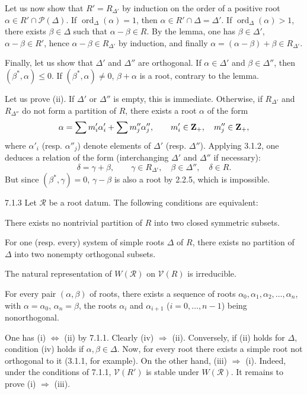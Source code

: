 Let us now show that $R'=R_{\Delta'}$ by induction on the order of a positive root $\alpha\in R'\cap\mathcal P(\Delta)$. If $\operatorname{ord}_\Delta(\alpha)=1$, then $\alpha\in R'\cap\Delta=\Delta'$. If $\operatorname{ord}_\Delta(\alpha)>1$, there exists $\beta\in\Delta$ such that $\alpha-\beta\in R$. By the lemma, one has $\beta\in\Delta'$, $\alpha-\beta\in R'$, hence $\alpha-\beta\in R_{\Delta'}$ by induction, and finally $\alpha=(\alpha-\beta)+\beta\in R_{\Delta'}$.

Finally, let us show that $\Delta'$ and $\Delta''$ are orthogonal. If $\alpha\in\Delta'$ and $\beta\in\Delta''$, then $(\beta^*,\alpha)\leq0$. If $(\beta^*,\alpha)\ne0$, $\beta+\alpha$ is a root, contrary to the lemma.

Let us prove (ii). If $\Delta'$ or $\Delta''$ is empty, this is immediate. Otherwise, if $R_{\Delta'}$ and $R_{\Delta''}$ do not form a partition of $R$, there exists a root $\alpha$ of the form
\[
\alpha=\sum m'_i\alpha'_i+\sum m''_j\alpha''_j,\qquad m'_i\in\mathbf{Z}_+,\quad m''_j\in\mathbf{Z}_+,
\]
where $\alpha'_i$ (resp. $\alpha''_j$) denote elements of $\Delta'$ (resp. $\Delta''$). Applying 3.1.2, one deduces a relation of the form (interchanging $\Delta'$ and $\Delta''$ if necessary):
\[
\delta=\gamma+\beta,\qquad\gamma\in R_{\Delta'},\quad\beta\in\Delta'',\quad\delta\in R.
\]
But since $(\beta^*,\gamma)=0$, $\gamma-\beta$ is also a root by 2.2.5, which is impossible.
\begin{proposition}{7.1.3}\label{XXI.7.1.3}
Let $\mathcal R$ be a root datum. The following conditions are equivalent:
\begin{enumeratei}
\item There exists no nontrivial partition of $R$ into two closed symmetric subsets.
\item For one (resp. every) system of simple roots $\Delta$ of $R$, there exists no partition of $\Delta$ into two nonempty orthogonal subsets.
\item The natural representation of $W(\mathcal R)$ on $\mathcal V(R)$ is irreducible.
\item For every pair $(\alpha,\beta)$ of roots, there exists a sequence of roots $\alpha_0,\alpha_1,\alpha_2,\ldots,\alpha_n$, with $\alpha=\alpha_0$, $\alpha_n=\beta$, the roots $\alpha_i$ and $\alpha_{i+1}$ ($i=0,\ldots,n-1$) being nonorthogonal.
\end{enumeratei}
\end{proposition}
One has (i) $\Leftrightarrow$ (ii) by 7.1.1. Clearly (iv) $\Rightarrow$ (ii). Conversely, if (ii) holds for $\Delta$, condition (iv) holds if $\alpha,\beta\in\Delta$. Now, for every root there exists a simple root not orthogonal to it (3.1.1, for example). On the other hand, (iii) $\Rightarrow$ (i). Indeed, under the conditions of 7.1.1, $\mathcal V(R')$ is stable under $W(\mathcal R)$. It remains to prove (i) $\Rightarrow$ (iii).

